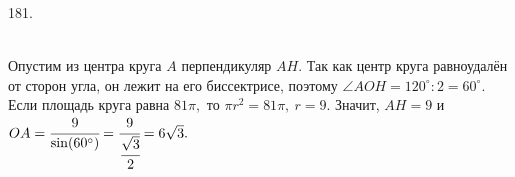 181. \begin{figure}[ht!]
\end{figure}\\
Опустим из центра круга $A$ перпендикуляр $AH.$ Так как центр круга равноудалён от сторон угла, он лежит на его биссектрисе, поэтому $\angle AOH=120^\circ:2=60^\circ.$ Если площадь круга равна $81\pi,$ то $\pi r^2=81\pi,\ r=9.$ Значит, $AH=9$ и $OA=\cfrac{9}{\sin(60^\circ)}=\cfrac{9}{\cfrac{\sqrt{3}}{2}}=6\sqrt{3}.$\\
